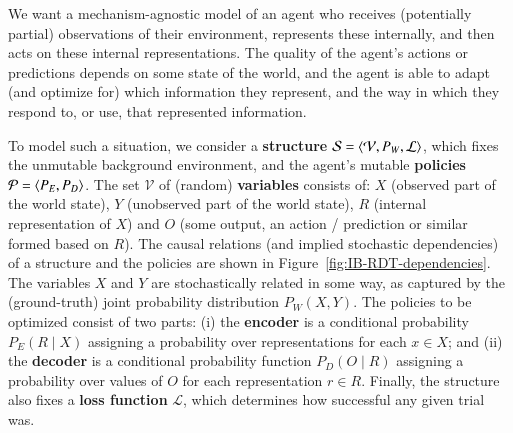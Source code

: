 \documentclass[nobib,nofonts]{tufte-handout}
\begin{document}
We want a mechanism-agnostic model of an agent
who receives (potentially partial) observations of their environment, represents these internally, and then acts on these internal representations.
The quality of the agent's actions or predictions depends on some state of the world, and the agent is able to adapt (and optimize for) which information they represent, and the way in which they respond to, or use, that represented information.

To model such a situation, we consider a \textbf{structure} $\mathcal{S} = \left \langle \mathcal{V}, P_{W}, \mathcal{L}\right\rangle$, which fixes the unmutable background environment, and the agent's mutable \textbf{policies} $\mathcal{P}=\left \langle P_{E}, P_{D}\right\rangle$.
The set $\mathcal{V}$ of (random) \textbf{variables} consists of: $X$ (observed part of the world state), $Y$ (unobserved part of the world state), $R$ (internal representation of $X$) and $O$ (some output, an action / prediction or similar formed based on $R$).
The causal relations (and implied stochastic dependencies) of a structure and the policies are shown in Figure~\ref{fig:IB-RDT-dependencies}.
The variables $X$ and $Y$ are stochastically related in some way, as captured by the (ground-truth) joint probability distribution $P_{W}(X,Y)$.
The policies to be optimized consist of two parts: (i) the \textbf{encoder} is a conditional probability $P_{E}(R \mid X)$ assigning a probability over representations for each $x \in X$; and (ii) the \textbf{decoder} is a conditional probability function $P_{D}(O \mid R)$ assigning a probability over values of $O$ for each representation $r \in R$.
Finally, the structure also fixes a \textbf{loss function} $\mathcal{L}$, which determines how successful any given trial was.
\end{document}
